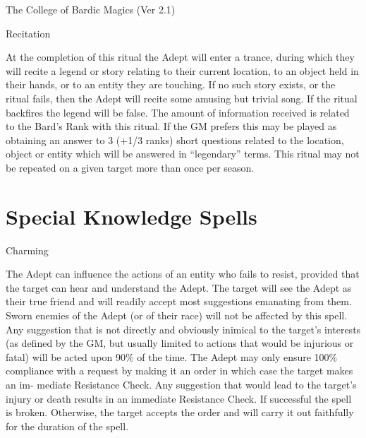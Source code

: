 \begin{Chapter}{The College of Bardic Magics (Ver 2.1)}
\begin{ritual}[Q-2]{Recitation}

\begin{effects}
At the completion of this ritual the Adept will enter a trance, during
which they will recite a legend or story relating to their current
location, to an object held in their hands, or to an entity they are
touching.  If no such story exists, or the ritual fails, then the
Adept will recite some amusing but trivial song.  If the ritual
backfires the legend will be false.  The amount of information
received is related to the Bard’s Rank with this ritual.  If the GM
prefers this may be played as obtaining an answer to 3 (+1/3 ranks)
short questions related to the location, object or entity which will
be answered in “legendary” terms.  This ritual may not be repeated on
a given target more than once per season.
\end{effects}
\end{ritual}


\section{Special Knowledge Spells}

\begin{spell}[S-1]{Charming}

\begin{effects}
The Adept can influence the actions of an entity who fails to resist,
provided that the target can hear and understand the Adept. The target
will see the Adept as their true friend and will readily accept most
suggestions emanating from them.  Sworn enemies of the Adept (or of
their race) will not be affected by this spell. Any suggestion that is
not directly and obviously inimical to the target’s interests (as
defined by the GM, but usually limited to actions that would be
injurious or fatal) will be acted upon 90\% of the time.  The Adept
may only ensure 100\% compliance with a request by making it an order
in which case the target makes an im- mediate Resistance Check.  Any
suggestion that would lead to the target’s injury or death results in
an immediate Resistance Check.  If successful the spell is broken.
Otherwise, the target accepts the order and will carry it out
faithfully for the duration of the spell.
\end{effects}
\end{spell}


\end{Chapter}
